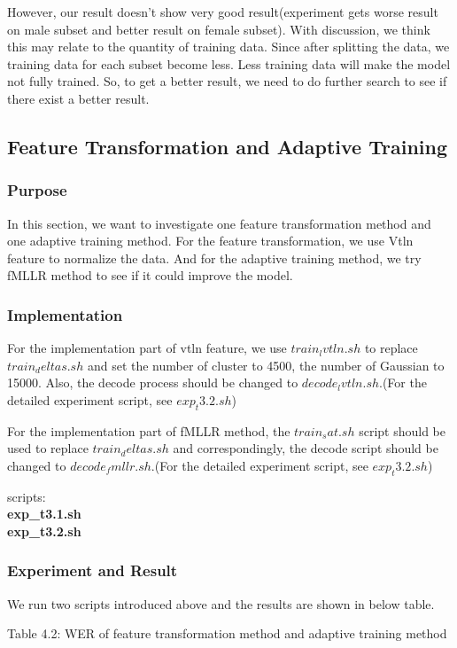 \documentclass[]{article}
\begin{document}
\begin{multicols*}{2}
However, our result doesn't show very good result(experiment gets worse result on male subset and better result on female subset). With discussion, we think this may relate to the quantity of training data. Since after splitting the data, we training data for each subset become less. Less training data will make the model not fully trained. So, to get a better result, we need to do further search to see if there exist a better result.

\subsection{Feature Transformation and Adaptive Training}
\subsubsection{Purpose}
In this section, we want to investigate one feature transformation method and one adaptive training method. For the feature transformation, we use Vtln feature to normalize the data. And for the adaptive training method, we try fMLLR method to see if it could improve the model.

\subsubsection{Implementation}
For the implementation part of vtln feature, we use $train_lvtln.sh$ to replace $train_deltas.sh$ and set the number of cluster to 4500, the number of Gaussian to 15000. Also, the decode process should be changed to $decode_lvtln.sh$.(For the detailed experiment script, see $exp_t3.2.sh$)

For the implementation part of fMLLR method, the $train_sat.sh$ script should be used to replace $train_deltas.sh$ and correspondingly, the decode script should be changed to $decode_fmllr.sh$.(For the detailed experiment script, see $exp_t3.2.sh$)

scripts: \textbf{\\ \indent exp\_t3.1.sh  \\ \indent exp\_t3.2.sh}

\subsubsection{Experiment and Result}
We run two scripts introduced above and the results are shown in below table.

\begin{center}
Table 4.2: WER of feature transformation method and adaptive training method


\end{center}
\end{multicols*}
\end{document}
